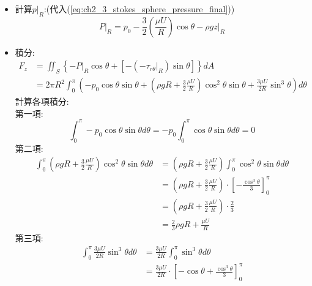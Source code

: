 \documentclass[../main.tex]{subfiles}
\begin{document}
\begin{itemize}
\begin{enumerate}
\begin{itemize}
\begin{align}
        -1 + 4 - \frac{3}{2}
      \right) \nonumber\\
      &= -\frac{3}{2} \mu U \sin\theta \label{eq:ch2_3_stokes_sphere_tau_rteta_R}
    \end{align}
    \item 計算$p\big|_R$:(代入(\ref{eq:ch2_3_stokes_sphere_pressure_final}))
    \begin{equation}
      P\big|_R = p_0 - \frac{3}{2}\left(
        \frac{\mu U}{R}
      \right) \cos\theta - \rho g z\big|_R
    \end{equation}
    \item 積分:
    \begin{align}
      F_z &= \iint_{S}\left\{
      -P\big|_R \cos\theta + \left[-\left(-\tau_{r\theta}\big|_R\right)\sin\theta\right]  
    \right\} dA \nonumber\\
    &= 2\pi R^2 \int_0^\pi \left(
      -p_0 \cos\theta\sin\theta + \left(
        \rho g R + \frac{3}{2}\frac{\mu U}{R}
      \right) \cos^2\theta \sin\theta + \frac{3\mu U}{2R} \sin^3\theta
    \right) d\theta 
    \end{align}
    計算各項積分:\\
    第一項:
    \begin{equation}
      \int_0^\pi -p_0 \cos\theta \sin\theta d\theta = -p_0 \int_0^\pi \cos\theta \sin\theta d\theta = 0
    \end{equation}
    第二項:
    \begin{align}
      \int_0^\pi \left(
        \rho g R + \frac{3}{2}\frac{\mu U}{R}
      \right) \cos^2\theta \sin\theta d\theta &= \left(
        \rho g R + \frac{3}{2}\frac{\mu U}{R}
      \right) \int_0^\pi \cos^2\theta \sin\theta d\theta \nonumber\\
      &= \left(
        \rho g R + \frac{3}{2}\frac{\mu U}{R}
      \right) \cdot \left[
        -\frac{\cos^3\theta}{3}
      \right]_0^\pi \nonumber\\
      &= \left(
        \rho g R + \frac{3}{2}\frac{\mu U}{R}
      \right) \cdot \frac{2}{3} \nonumber\\
      &= \frac{2}{3}\rho gR + \frac{\mu U}{R}
    \end{align}
    第三項:
    \begin{align}
      \int_0^\pi \frac{3\mu U}{2R} \sin^3\theta d\theta &= \frac{3\mu U}{2R} \int_0^\pi \sin^3\theta d\theta \nonumber\\
      &= \frac{3\mu U}{2R} \cdot \left[
        -\cos\theta + \frac{\cos^3\theta}{3}
      \right]_0^\pi \nonumber\\

\end{align}
\end{itemize}
\end{enumerate}
\end{itemize}
\end{document}
